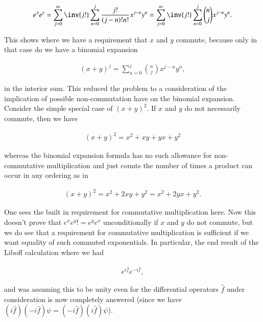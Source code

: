 \begin{align}\label{eqn:exponentialCommutation:6}
e^{x} e^{y} 
= 
\sum_{j=0}^\infty \inv{j!} \sum_{n=0}^j \frac{j!}{(j-n)! n!} x^{j-n} y^n
= 
\sum_{j=0}^\infty \inv{j!} \sum_{n=0}^j \binom{n}{j} x^{j-n} y^n.
\end{align}

This shows where we have a requirement that $x$ and $y$ commute, because only in that case do we have a binomial expansion

\begin{align}\label{eqn:exponentialCommutation:6b}
(x + y)^j = \sum_{n=0}^j \binom{n}{j} x^{j-n} y^n,
\end{align}

in the interior sum.  This reduced the problem to a consideration of the implication of possible non-commutation have on the binomial expansion.  Consider the simple special case of $(x + y)^2$.  If $x$ and $y$ do not necessarily commute, then we have

\begin{align}\label{eqn:exponentialCommutation:7}
(x + y)^2 = x^2 + x y + y x + y^2
\end{align}

whereas the binomial expansion formula has no such allowance for non-commutative multiplication and just counts the number of times a product can occur in any ordering as in

\begin{align}\label{eqn:exponentialCommutation:8}
(x + y)^2 = x^2 + 2 x y + y^2 = x^2 + 2 y x + y^2.
\end{align}

One sees the built in requirement for commutative multiplication here.  Now this doesn't prove that $e^{x} e^{y} != e^{y} e^{x}$ unconditionally if $x$ and $y$ do not commute, but we do see that a requirement for commutative multiplication is sufficient if we want equality of such commuted exponentials.  In particular, the end result of the Liboff calculation where we had

\begin{align}\label{eqn:exponentialCommutation:9}
e^{i \hat{f}} e^{-i \hat{f}},
\end{align}

and was assuming this to be unity even for the differential operators $\hat{f}$ under consideration is now completely answered (since we have $(i \hat{f}) (-i \hat{f}) \psi = (-i \hat{f}) (i \hat{f}) \psi$).

\EndNoBibArticle
